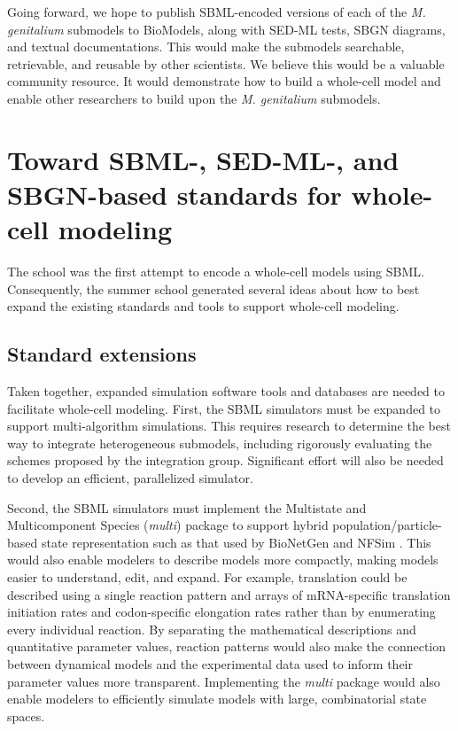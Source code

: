 \documentclass[journal,transmag]{IEEEtran}
\begin{document}
Going forward, we hope to publish SBML-encoded versions of each of the \textit{M. genitalium} submodels to BioModels, along with SED-ML tests, SBGN diagrams, and textual documentations. This would make the submodels searchable, retrievable, and reusable by other scientists. We believe this would be a valuable community resource. It would demonstrate how to build a whole-cell model and enable other researchers to build upon the \textit{M. genitalium} submodels.

\section{Toward SBML-, SED-ML-, and SBGN-based standards for whole-cell modeling}
The school was the first attempt to encode a whole-cell models using SBML. Consequently, the summer school generated several ideas about how to best expand the existing standards and tools to support whole-cell modeling.

\subsection{Standard extensions}
Taken together, expanded simulation software tools and databases are needed to facilitate whole-cell modeling. First, the SBML simulators must be expanded to support multi-algorithm simulations. This requires research to determine the best way to integrate heterogeneous submodels, including rigorously evaluating the schemes proposed by the integration group. Significant effort will also be needed to develop an efficient, parallelized simulator.

Second, the SBML simulators must implement the Multistate and Multicomponent Species (\emph{multi}) package to support hybrid population/particle-based state representation such as that used by BioNetGen \cite{Hlavacek2006, Hogg2014} and NFSim \cite{Sneddon2011}. This would also enable modelers to describe models more compactly, making models easier to understand, edit, and expand. For example, translation could be described using a single reaction pattern and arrays of mRNA-specific translation initiation rates and codon-specific elongation rates rather than by enumerating every individual reaction. By separating the mathematical descriptions and quantitative parameter values, reaction patterns would also make the connection between dynamical models and the experimental data used to inform their parameter values more transparent. Implementing the \emph{multi} package would also enable modelers to efficiently simulate models with large, combinatorial state spaces.
\end{document}
